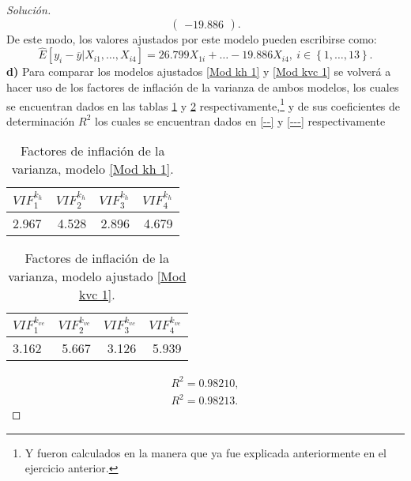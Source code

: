 \documentclass[10.5pt,notitlepage]{article}
\newenvironment{solucion}
  {\begin{proof}[Solución]}
  {\end{proof}}
\newcommand{\kis}[1]{\left\{ #1 \right\}}
\theoremstyle{plain}
\begin{document}
\begin{solucion}
\begin{equation*}
\begin{pmatrix}
 -19.886\end{pmatrix}.
\end{equation*}
De este modo, los valores ajustados por este modelo pueden escribirse como:
\begin{equation}\label{Mod kvc 1}
      \widehat{E}[y_{i} - \overline{y}| X_{i1}, \hdots, X_{i4}] =  26.799 X_{1i} + \hdots -19.886 X_{i4}, \ i \in \kis{1, \hdots, 13}.
\end{equation} 
\noindent \textbf{d)} Para comparar los modelos ajustados \eqref{Mod kh 1} y \eqref{Mod kvc 1} se volverá a hacer uso de los factores de inflación de la varianza de ambos modelos, los cuales se encuentran dados en las tablas \ref{tab:ref30} y \ref{tab:ref31} respectivamente,\footnote{Y fueron calculados en la manera que ya fue explicada anteriormente en el ejercicio anterior.} y de sus coeficientes de determinación \(R^2\) los cuales se encuentran dados en \eqref{--} y \eqref{---} respectivamente
\begin{table}[H]
        \centering
        \begin{tabular}{@{}l@{\hskip 0.3in}r@{\hskip 0.3in}r@{\hskip 0.3in}r@{}}
            \toprule
            \(VIF_{1}^{k_h}\)& \(VIF_{2}^{k_h}\) & \(VIF_{3}^{k_h}\)& \(VIF_{4}^{k_h}\)\\
            \midrule
              2.967& 4.528 &2.896& 4.679\\  
            \bottomrule
        \end{tabular}
        \caption{Factores de inflación de la varianza, modelo \eqref{Mod kh 1}.}
        \label{tab:ref30}
\end{table}
\begin{table}[H]
        \centering
        \begin{tabular}{@{}l@{\hskip 0.3in}r@{\hskip 0.3in}r@{\hskip 0.3in}r@{}}
            \toprule
            \(VIF_{1}^{k_{vc}}\)& \(VIF_{2}^{k_{vc}}\) & \(VIF_{3}^{k_{vc}}\)& \(VIF_{4}^{k_{vc}}\) \\
            \midrule
            3.162& 5.667& 3.126& 5.939 \\  
            \bottomrule
        \end{tabular}
        \caption{Factores de inflación de la varianza, modelo ajustado \eqref{Mod kvc 1}.}
        \label{tab:ref31}
\end{table}
\begin{align}
    R^2 = 0.98210, \label{--}\\ 
    R^2 = 0.98213. \label{---}
\end{align}

\end{solucion}
\end{document}
